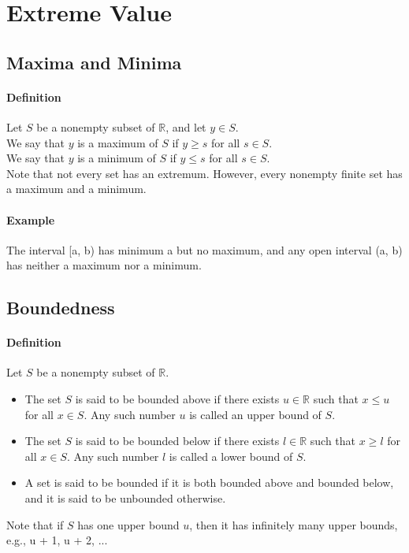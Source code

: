 \documentclass[12pt]{article}
\begin{document}
\section{Extreme Value}
\subsection{Maxima and Minima}
\paragraph{Definition}
Let $S$ be a nonempty subset of $\mathbb{R}$, and let $y \in S$. \\
We say that $y$ is a maximum of $S$ if $y \geq s$ for all $s \in S$. \\
We say that $y$ is a minimum of $S$ if $y \leq s$ for all $s \in S$. \\

\noindent
Note that not every set has an extremum. However, every nonempty finite set has a maximum and a minimum. 

\paragraph{Example}
The interval [a, b) has minimum a but no maximum, and any open interval (a, b) has
neither a maximum nor a minimum.

\subsection{Boundedness}
\paragraph{Definition} Let $S$ be a nonempty subset of $\mathbb{R}$.
\begin{itemize} 
    \item The set $S$ is said to be bounded above if there exists $u \in \mathbb{R}$
    such that $x \leq u$ for all $x \in S$. Any such number $u$ is called an
    upper bound of $S$.
    \item The set $S$ is said to be bounded below if there exists $l \in \mathbb{R}$
    such that $x \geq l$ for all $x \in S$. Any such number $l$ is called a
    lower bound of $S$.
    \item A set is said to be bounded if it is both bounded above and
    bounded below, and it is said to be unbounded otherwise.
\end{itemize}
\noindent
Note that if $S$ has one upper bound $u$, then it has infinitely many
upper bounds, e.g., u + 1, u + 2, ...
\end{document}
